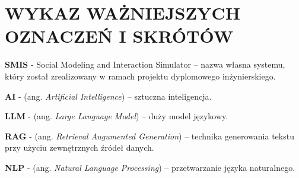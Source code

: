 \chapter*{WYKAZ WAŻNIEJSZYCH OZNACZEŃ I SKRÓTÓW}

\textbf{SMIS} - Social Modeling and Interaction Simulator -- nazwa własna systemu, który został zrealizowany w ramach projektu dyplomowego inżynierskiego.

\textbf{AI} - (ang. \textit{Artificial Intelligence}) -- sztuczna inteligencja.

\textbf{LLM} - (ang. \textit{Large Language Model}) -- duży model językowy.

\textbf{RAG} - (ang. \textit{Retrieval Augumented Generation}) -- technika generowania tekstu przy użyciu zewnętrznych źródeł danych.

\textbf{NLP} - (ang. \textit{Natural Language Processing}) -- przetwarzanie języka naturalnego.
